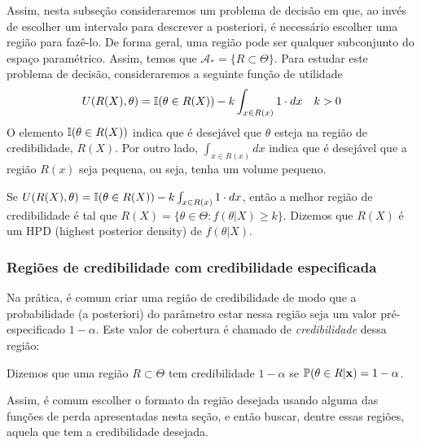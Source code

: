 Assim, nesta subseção consideraremos 
um problema de decisão em que,
ao invés de escolher um intervalo para 
descrever a posteriori,
é necessário escolher uma região para fazê-lo.
De forma geral, uma região pode ser 
qualquer subconjunto do espaço paramétrico.
Assim, temos que
$\mathcal{A}_{*} = \{R \subset \Theta\}$.
Para estudar este problema de decisão,
consideraremos a seguinte função de utilidade
\begin{align*}
 U(R(X),\theta)	
 &= {\mathbb I}(\theta \in R(X)) 
 -k\int_{x \in R(x)}{1 \cdot dx}
 & k > 0
\end{align*}
O elemento ${\mathbb I}(\theta \in R(X))$ indica que 
é desejável que $\theta$ esteja 
na região de credibilidade, $R(X)$.
Por outro lado,  $\int_{x \in R(x)}{dx}$ indica que
é desejável que a região $R(x)$ seja pequena, 
ou seja, tenha um volume pequeno.
\begin{theorem}
 \label{thm:hpd}
 Se $U(R(X),\theta)	= {\mathbb I}(\theta \in R(X)) - k\int_{x \in R(x)}{1 \cdot dx}$, então 
 a melhor região de credibilidade é tal que 
 $R(X) = \{\theta \in \Theta: f(\theta|X) \geq k\}$.
 Dizemos que $R(X)$ é um HPD (highest posterior density) 
 de $f(\theta|X)$.
\end{theorem}


\subsubsection{Regiões de credibilidade com credibilidade especificada}
 \label{sec:credibilidade}
 
 
Na prática, é comum criar uma região de credibilidade
de modo que a probabilidade (a posteriori) do parâmetro estar nessa região
seja um valor pré-especificado $1-\alpha$. Este valor de cobertura é chamado de 
\emph{credibilidade} dessa região:
\begin{definition}
Dizemos que uma região $R \subset \Theta$ tem credibilidade $1-\alpha$
se ${\mathbb P}(\theta \in R|{\mathbf{x}})=1-\alpha$.
\end{definition}

Assim, é comum escolher o formato da região desejada usando 
alguma das funções de perda apresentadas nesta seção, e então buscar, dentre essas regiões,
aquela que tem a credibilidade desejada.

